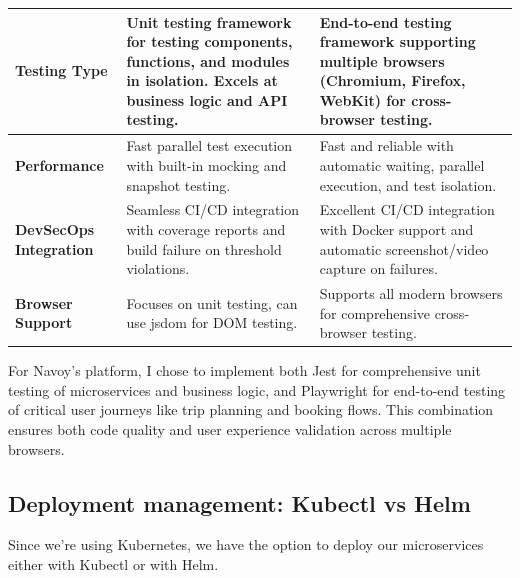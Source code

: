 \begin{longtable}{| p{} | p{} | p{} |}
    \textbf{Testing Type}              & Unit testing framework for testing components, functions, and modules in isolation. Excels at business logic and API testing. & End-to-end testing framework supporting multiple browsers (Chromium, Firefox, WebKit) for cross-browser testing. \\
    \hline
    \textbf{Performance}               & Fast parallel test execution with built-in mocking and snapshot testing.                                                      & Fast and reliable with automatic waiting, parallel execution, and test isolation.                                \\
    \hline
    \textbf{DevSecOps Integration}     & Seamless CI/CD integration with coverage reports and build failure on threshold violations.                                   & Excellent CI/CD integration with Docker support and automatic screenshot/video capture on failures.              \\
    \hline
    \textbf{Browser Support}           & Focuses on unit testing, can use jsdom for DOM testing.                                                                       & Supports all modern browsers for comprehensive cross-browser testing.                                            \\
    \hline
\end{longtable}

For Navoy's platform, I chose to implement both Jest for comprehensive unit testing of microservices and business logic, and Playwright for end-to-end testing of critical user journeys like trip planning and booking flows. This combination ensures both code quality and user experience validation across multiple browsers.

\subsection{Deployment management: Kubectl vs Helm}
Since we're using Kubernetes, we have the option to deploy our microservices either with Kubectl or with Helm.

